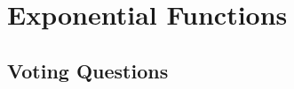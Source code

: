 \section{Exponential Functions} \label{S:0.2.Exponentials}


\newpage

\newpage

\newpage

\newpage
% 
\subsection*{Voting Questions}

\newpage
